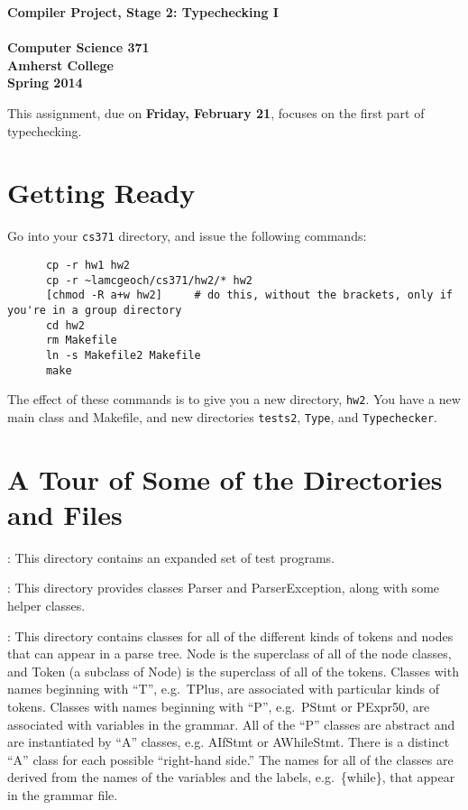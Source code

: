 \documentclass[11pt]{article}
\begin{document}
\begin{center}
\Large \bf Compiler Project, Stage 2: Typechecking  I\\ \mbox{} \\
\large Computer Science 371 \\
\large Amherst College \\
\large Spring 2014
\end{center}

This assignment, due on {\bf Friday, February 21}, focuses on the first part of typechecking.

\section{Getting Ready}

Go into your \verb'cs371' directory, and issue the following commands:
\begin{verbatim}
      cp -r hw1 hw2                   
      cp -r ~lamcgeoch/cs371/hw2/* hw2
      [chmod -R a+w hw2]     # do this, without the brackets, only if you're in a group directory 
      cd hw2
      rm Makefile
      ln -s Makefile2 Makefile
      make
\end{verbatim}
The effect of these commands is to give you a new directory, \verb'hw2'.  You have a new main class and Makefile, and new directories \verb'tests2', \verb'Type', and \verb'Typechecker'.

\section{A Tour of Some of the Directories and Files}

:  This directory contains an expanded set of test programs.

\mbox{}\par{}:  This directory provides classes Parser and ParserException, along with some helper classes.

\mbox{}\par{}:  This directory contains classes for all of the different kinds of tokens and nodes that can appear in a parse tree.  Node is the superclass of all of the node classes, and Token (a subclass of Node) is the superclass of all of the tokens.  Classes with names beginning with ``T'', e.g.\ TPlus, are associated with particular kinds of tokens.  Classes with names beginning with ``P'', e.g.\ PStmt or PExpr50, are associated with variables in the grammar.  All of the ``P'' classes are abstract and are instantiated by ``A'' classes, e.g. AIfStmt or AWhileStmt.  There is a distinct ``A'' class for each possible ``right-hand side.''  The names for all of the classes are derived from the names of the variables and the labels, e.g.\ \{while\}, that appear in the grammar file.
\end{document}
